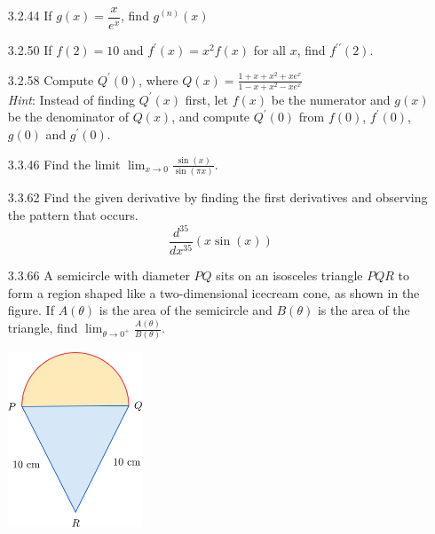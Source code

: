 \documentclass{article}
\begin{document}
\begin{enumerate}
    \vspace{6cm}

    \item[3.2.44]
        If $g(x)=\dfrac{x}{e^x}$, find $g^{(n)}(x)$

    \vspace{6cm}

    \item[3.2.50]
        If $f(2)=10$ and $f^{\prime}(x)=x^2f(x)$ for all $x$, find $f^{\prime\prime}(2)$.

    \newpage

    \item[3.2.58]
        Compute $Q^{\prime}(0)$, where $\displaystyle Q(x) = \frac{1+x+x^2+x e^{x}}{1 - x+ x^2 -x e^{x}}$ \\
        [12pt] \textit{Hint}: Instead of finding $Q^{\prime}(x)$ first,
        let $f(x)$ be the numerator and $g(x)$ be the denominator of $Q(x)$,
        and compute $Q^{\prime}(0)$ from $f(0)$, $f^{\prime}(0)$, $g(0)$ and $g^{\prime}(0)$.

    \vspace{6cm}

    \item[3.3.46]
        Find the limit $\displaystyle  \lim_{x \to 0 } \frac{\sin (x) }{\sin ( \pi x) }$.

    \vspace{6cm}

    \item[3.3.62]
        Find the given derivative by finding the first derivatives and observing the pattern that occurs.
        \[
            \frac{d^{35}}{dx^{35}} (x \sin (x))
        \]

    \newpage

    \item[3.3.66]
        A semicircle with diameter $PQ$ sits on an isosceles triangle $PQR$ to
        form a region shaped like a two-dimensional icecream cone, as shown in the figure.
        If $A( \theta )$ is the area of the semicircle and $B( \theta  )$ is the area of the triangle, find
        $\displaystyle  \lim_{ \theta  \to 0^{+}} \frac{A( \theta  )}{B( \theta  )}$.

        \includegraphics[width=4cm]{./png/3.3.66.png}


\end{enumerate}
\end{document}
